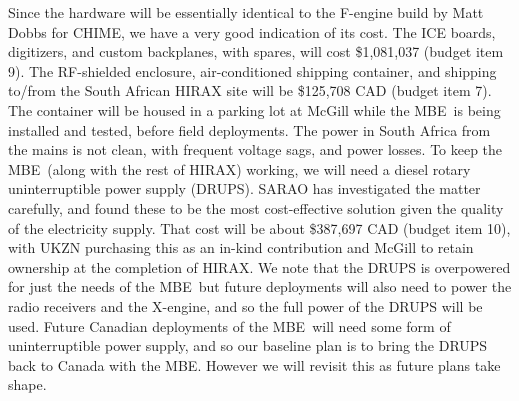 \documentclass[letterpaper,11pt,preprint]{aastex}
\newcommand{\mbe}{{\rm MBE}}
\begin{document}
Since the hardware will be essentially identical to the F-engine build
by Matt Dobbs for CHIME, we have a very good indication of its cost.
The ICE boards, digitizers, and custom backplanes, with spares, will
cost \$1,081,037 (budget item 9).
The RF-shielded enclosure,
 air-conditioned shipping container, and shipping to/from the South
 African HIRAX site will be \$125,708 CAD (budget item 7).  The
 container will be housed in a parking lot at McGill while the
 \mbe\ is being installed and tested, before field deployments.
The power in South Africa from the mains is not
clean, with frequent voltage sags, and power losses.  To keep the \mbe\
(along with the rest of HIRAX) working, we will need a diesel rotary
uninterruptible power supply (DRUPS).  SARAO has investigated the
matter carefully, and found these to be the most cost-effective
solution given the quality of the electricity supply.  That cost
will be about \$387,697 CAD (budget item 10), with UKZN purchasing this as an in-kind
contribution and McGill to retain ownership at the completion of
HIRAX.  We note that the DRUPS is overpowered for just the needs of the
\mbe\, but future deployments will also need to power the radio
receivers and the X-engine, and so the full power of the DRUPS will be
used.  Future Canadian deployments of the \mbe\ will need some form of
uninterruptible power supply, and so our baseline plan is to bring the
DRUPS back to Canada with the \mbe.  However we will revisit this as
future plans take shape.
\end{document}
